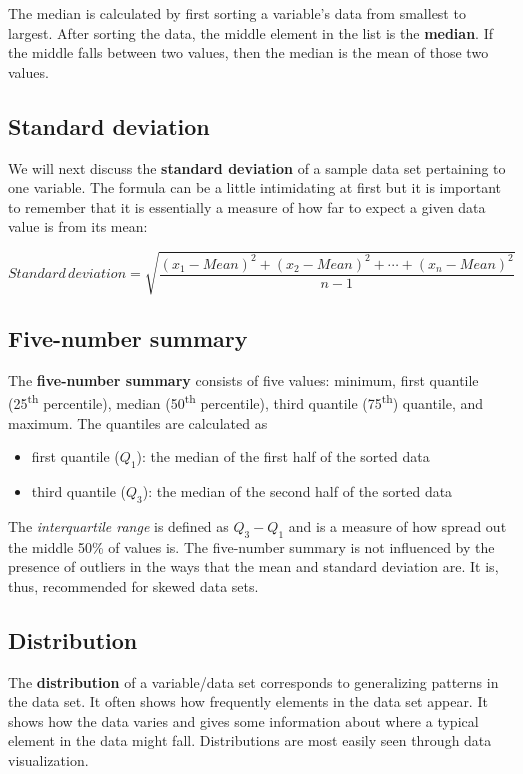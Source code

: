 \documentclass[]{tufte-book}
\providecommand{\tightlist}{%
  \setlength{\itemsep}{0pt}\setlength{\parskip}{0pt}}
\theoremstyle{definition}
\theoremstyle{definition}
\theoremstyle{remark}
\begin{document}
The median is calculated by first sorting a variable's data from
smallest to largest. After sorting the data, the middle element in the
list is the \textbf{median}. If the middle falls between two values,
then the median is the mean of those two values.

\subsection{Standard deviation}\label{standard-deviation}

We will next discuss the \textbf{standard deviation} of a sample data
set pertaining to one variable. The formula can be a little intimidating
at first but it is important to remember that it is essentially a
measure of how far to expect a given data value is from its mean:

\[Standard \, deviation = \sqrt{\frac{(x_1 - Mean)^2 + (x_2 - Mean)^2 + \cdots + (x_n - Mean)^2}{n - 1}}\]

\subsection{Five-number summary}\label{five-number-summary}

The \textbf{five-number summary} consists of five values: minimum, first
quantile (25\textsuperscript{th} percentile), median
(50\textsuperscript{th} percentile), third quantile
(75\textsuperscript{th}) quantile, and maximum. The quantiles are
calculated as

\begin{itemize}
\tightlist
\item
  first quantile (\(Q_1\)): the median of the first half of the sorted
  data
\item
  third quantile (\(Q_3\)): the median of the second half of the sorted
  data
\end{itemize}

The \emph{interquartile range} is defined as \(Q_3 - Q_1\) and is a
measure of how spread out the middle 50\% of values is. The five-number
summary is not influenced by the presence of outliers in the ways that
the mean and standard deviation are. It is, thus, recommended for skewed
data sets.

\subsection{Distribution}\label{distribution}

The \textbf{distribution} of a variable/data set corresponds to
generalizing patterns in the data set. It often shows how frequently
elements in the data set appear. It shows how the data varies and gives
some information about where a typical element in the data might fall.
Distributions are most easily seen through data visualization.
\end{document}
